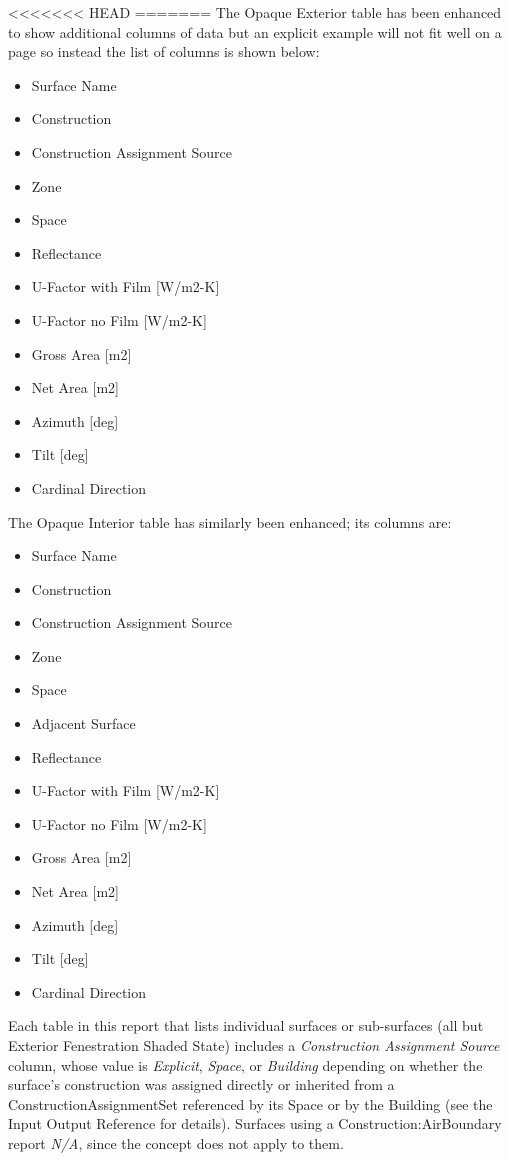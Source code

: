 <<<<<<< HEAD
=======
The Opaque Exterior table has been enhanced to show additional columns of data but an explicit example will not fit well on a page so instead the list of columns is shown below:

\begin{itemize}
\item
  Surface Name
\item
  Construction
\item
  Construction Assignment Source
\item
  Zone
\item
  Space
\item
  Reflectance
\item
  U-Factor with Film [W/m2-K]
\item
  U-Factor no Film [W/m2-K]
\item
  Gross Area [m2]
\item
  Net Area [m2]
\item
  Azimuth [deg]
\item
  Tilt [deg]
\item
  Cardinal Direction
\end{itemize}

The Opaque Interior table has similarly been enhanced; its columns are:

\begin{itemize}
\item
  Surface Name
\item
  Construction
\item
  Construction Assignment Source
\item
  Zone
\item
  Space
\item
  Adjacent Surface
\item
  Reflectance
\item
  U-Factor with Film [W/m2-K]
\item
  U-Factor no Film [W/m2-K]
\item
  Gross Area [m2]
\item
  Net Area [m2]
\item
  Azimuth [deg]
\item
  Tilt [deg]
\item
  Cardinal Direction
\end{itemize}

Each table in this report that lists individual surfaces or sub-surfaces (all but Exterior Fenestration Shaded State) includes a \emph{Construction Assignment Source} column, whose value is \emph{Explicit}, \emph{Space}, or \emph{Building} depending on whether the surface's construction was assigned directly or inherited from a ConstructionAssignmentSet referenced by its Space or by the Building (see the Input Output Reference for details). Surfaces using a Construction:AirBoundary report \emph{N/A}, since the concept does not apply to them.

